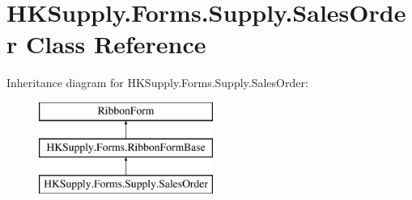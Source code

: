 \hypertarget{class_h_k_supply_1_1_forms_1_1_supply_1_1_sales_order}{}\section{H\+K\+Supply.\+Forms.\+Supply.\+Sales\+Order Class Reference}
\label{class_h_k_supply_1_1_forms_1_1_supply_1_1_sales_order}
Inheritance diagram for H\+K\+Supply.\+Forms.\+Supply.\+Sales\+Order\+:\begin{figure}[H]
\begin{center}
\leavevmode
\includegraphics[height=3.000000cm]{class_h_k_supply_1_1_forms_1_1_supply_1_1_sales_order}
\end{center}
\end{figure}
